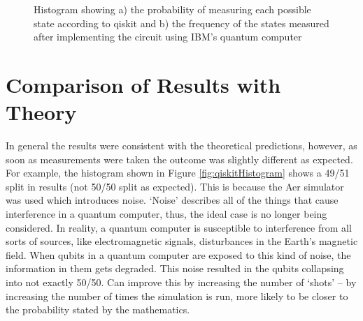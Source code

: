 \begin{figure}[h]
\begin{subfigure}[h]{0.43\textwidth}
        \caption{} 
        \label{fig:ibmHistogram}
    \end{subfigure}
    \caption{Histogram showing a) the probability of measuring each possible state according to qiskit and b) the frequency of the states measured after implementing the circuit using IBM's quantum computer} 
    \label{fig:hisogram}
\end{figure}

\section{Comparison of Results with Theory} \label{sec:comparison}

In general the results were consistent with the theoretical predictions, however, as soon as measurements were taken the outcome was slightly different as expected. For example, the histogram shown in Figure \ref{fig:qiskitHistogram} shows a 49/51 split in results (not 50/50 split as expected). This is because the Aer simulator was used which introduces noise. `Noise' describes all of the things that cause interference in a quantum computer, thus, the ideal case is no longer being considered. In reality, a quantum computer is susceptible to interference from all sorts of sources, like electromagnetic signals, 
disturbances in the Earth’s magnetic field. When qubits in a quantum computer are exposed to this kind of noise, the information in them gets degraded. This noise resulted in the qubits collapsing into not exactly 50/50. Can improve this by increasing the number of `shots' -- by increasing the number of times the simulation is run, more likely to be closer to the probability stated by the mathematics. 

